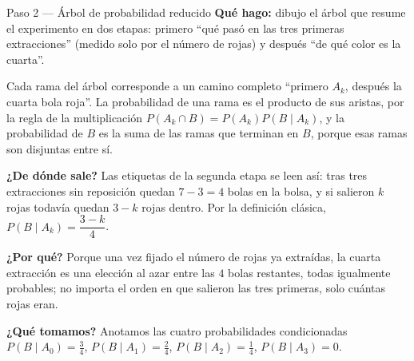 \documentclass[11pt]{article}
\begin{document}
\begin{paso}{Paso 2 --- Árbol de probabilidad reducido}
\textbf{Qué hago:} dibujo el árbol que resume el experimento en dos etapas: primero ``qué pasó en las tres primeras extracciones'' (medido solo por el número de rojas) y después ``de qué color es la cuarta''.

\begin{center}
\end{center}

Cada rama del árbol corresponde a un camino completo ``primero $A_k$, después la cuarta bola roja''. La probabilidad de una rama es el producto de sus aristas, por la regla de la multiplicación $P(A_k\cap B)=P(A_k)P(B\mid A_k)$, y la probabilidad de $B$ es la suma de las ramas que terminan en $B$, porque esas ramas son disjuntas entre sí.

\textbf{¿De dónde sale?} Las etiquetas de la segunda etapa se leen así: tras tres extracciones sin reposición quedan $7-3=4$ bolas en la bolsa, y si salieron $k$ rojas todavía quedan $3-k$ rojas dentro. Por la definición clásica, $P(B\mid A_k)=\dfrac{3-k}{4}$.

\textbf{¿Por qué?} Porque una vez fijado el número de rojas ya extraídas, la cuarta extracción es una elección al azar entre las $4$ bolas restantes, todas igualmente probables; no importa el orden en que salieron las tres primeras, solo cuántas rojas eran.

\textbf{¿Qué tomamos?} Anotamos las cuatro probabilidades condicionadas $P(B\mid A_0)=\tfrac34$, $P(B\mid A_1)=\tfrac24$, $P(B\mid A_2)=\tfrac14$, $P(B\mid A_3)=0$.
\end{paso}
\end{document}
